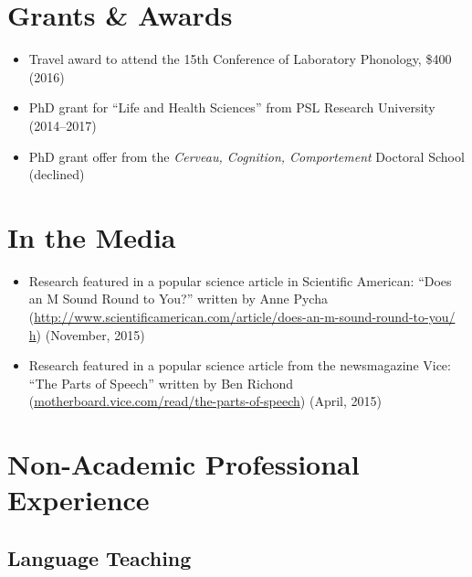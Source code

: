 \documentclass[a4paper, 10pt]{article}
\begin{document}
\section*{Grants \& Awards}

\begin{itemize}
\RaggedRight
\item Travel award to attend the 15th Conference of Laboratory
  Phonology, \$400 (2016)

\item PhD grant for \enquote{Life and Health Sciences} from 
  {PSL} Research University (2014--2017)

\item PhD grant offer from the \emph{Cerveau, Cognition, Comportement}
  Doctoral School (declined)




\end{itemize}


\section*{In the Media}

\begin{itemize}

\item Research featured in a popular science article in Scientific American: \enquote{Does an M Sound Round to You?} written by Anne Pycha (\url{http://www.scientificamerican.com/article/does-an-m-sound-round-to-you/
h})  (November, 2015)

\item Research featured in a popular science article from the
  newsmagazine Vice: \enquote{The Parts of Speech} written by Ben
  Richond (\url{motherboard.vice.com/read/the-parts-of-speech})
  (April, 2015)

\end{itemize}




\iffalse

\section*{Non-Academic Professional Experience}

\subsection*{Language Teaching}
\end{document}
